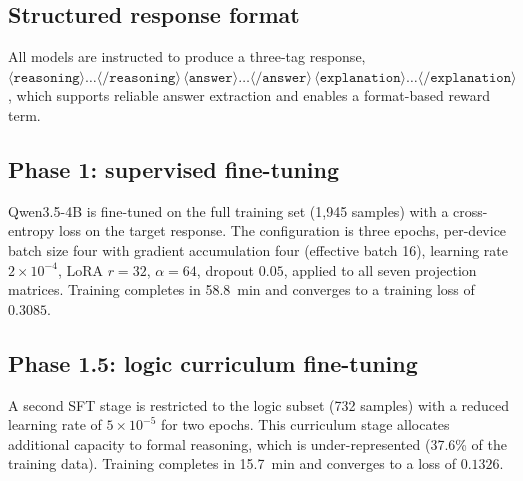 \documentclass[APA,twocolumn]{USG}
\newcommand{\basemodelname}{Qwen3.5-4B}
\begin{document}
\subsection{Structured response format}
All models are instructed to produce a three-tag response,
$\langle\texttt{reasoning}\rangle\ldots\langle/\texttt{reasoning}\rangle\,
\langle\texttt{answer}\rangle\ldots\langle/\texttt{answer}\rangle\,
\langle\texttt{explanation}\rangle\ldots\langle/\texttt{explanation}\rangle$,
which supports reliable answer extraction and enables a format-based reward
term.

\subsection{Phase 1: supervised fine-tuning}
\basemodelname{} is fine-tuned on the full training set (1{,}945 samples) with a
cross-entropy loss on the target response. The configuration is three epochs,
per-device batch size four with gradient accumulation four (effective batch
16), learning rate $2\times10^{-4}$, LoRA $r{=}32$, $\alpha{=}64$, dropout
$0.05$, applied to all seven projection matrices. Training completes in
58.8~min and converges to a training loss of $0.3085$.

\subsection{Phase 1.5: logic curriculum fine-tuning}
A second SFT stage is restricted to the logic subset (732 samples) with a
reduced learning rate of $5\times10^{-5}$ for two epochs. This curriculum stage
\citep{Bengio2009} allocates additional capacity to formal reasoning, which is
under-represented (37.6\% of the training data). Training completes in 15.7~min
and converges to a loss of $0.1326$.
\end{document}
